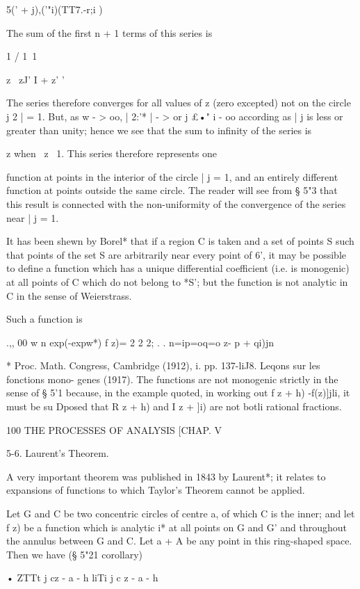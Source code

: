 {{5(' + j)\!,('"i)(TT7.-r;i )

The sum of the first n + 1 terms of this series is

1 / 1\ 1

z \ zJ' I + z' '

The series therefore converges for all values of z (zero excepted) not
on the circle j 2 | = 1. But, as w - > oo, | 2:'* | - > or j £•" i -
oo according as | j is less or greater than unity; hence we see that
the sum to infinity of the series is

z when \ z\ < 1, and - when | j > 1. This series therefore represents
one

function at points in the interior of the circle | j = 1, and an
entirely different function at points outside the same circle. The
reader will see from § 5"3 that this result is connected with the
non-uniformity of the convergence of the series near | j = 1.

It has been shewn by Borel* that if a region C is taken and a set of
points S such that points of the set S are arbitrarily near every
point of 6', it may be possible to define a function which has a
unique differential coefficient (i.e. is monogenic) at all points of C
which do not belong to *S'; but the function is not analytic in C in
the sense of Weierstrass.

Such a function is

.,, 00 w n exp(-expw*) f z)= 2 2 2; . . n=ip=oq=o z- p + qi)jn

* Proc. Math. Congress, Cambridge (1912), i. pp. 137-liJ8. Leqons sur
les fonctions mono- genes (1917). The functions are not monogenic
strictly in the sense of § 5'1 because, in the example quoted, in
working out f z + h) -f(z)]jli, it must be su Dposed that R z + h) and
I z + ]i) are not botli rational fractions.

100 THE PROCESSES OF ANALYSIS [CHAP. V

5-6. Laurent's Theorem.

A very important theorem was published in 1843 by Laurent*; it
relates to expansions of functions to which Taylor's Theorem cannot be
applied.

Let G and C be two concentric circles of centre a, of which C is the
inner; and let f z) be a function which is analytic i* at all points
on G and G' and throughout the annulus between G and C. Let a + A be
any point in this ring-shaped space. Then we have (§ 5"21 corollary)

• ZTTt j cz - a - h liTi j c z - a - h

}}
